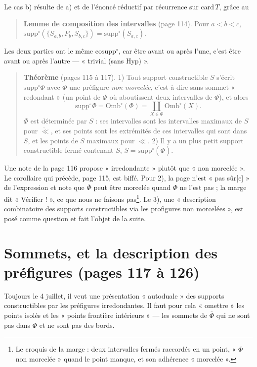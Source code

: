 \documentclass[11pt,a4paper]{article}
\begin{document}
Le cas b) résulte de a) et de l'énoncé réductif par récurrence sur
$\mathrm{card}\, T$, grâce au
\begin{quote}
\textbf{Lemme de composition des intervalles} (page 114). Pour $a < b < c$,
$\mathrm{supp}^{\circ}(\{S_{a,b}, P_{b}, S_{b,c}\}) =
\mathrm{supp}^{\circ}(S_{a,c})$.
\end{quote}
Les deux parties ont le même $\mathrm{cosupp}^{\circ}$, car être avant ou après
l'une, c'est être avant ou après l'autre --- « trivial (sans Hyp) ».

\begin{quote}
\textbf{Théorème} (pages 115 à 117). 1) Tout support constructible $S$ s'écrit
$\mathrm{supp}^{\circ}\Phi$ avec $\Phi$ une préfigure \emph{non morcelée},
c'est-à-dire sans sommet « redondant » (un point de $\Phi$ où aboutissent deux
intervalles de $\Phi$), et alors
\[
\mathrm{supp}^{\circ}\Phi = \mathrm{Omb}^{\circ}(\Phi) = \coprod_{X \in \Phi}
\mathrm{Omb}^{\circ}(X).
\]
$\Phi$ est déterminée par $S$ : ses intervalles sont les intervalles maximaux de
$S$ pour $\mathring{\ll}$, et ses points sont les extrémités de ces intervalles
qui sont dans $S$, et les points de $S$ maximaux pour $\ll$. 2) Il y a un plus
petit support constructible fermé contenant $S$, $\overline{S} =
\mathrm{supp}^{\circ}(\overline{\Phi})$.
\end{quote}

Une note de la page 116 propose « irredondante » plutôt que « non morcelée ».
Le corollaire qui précède, page 115, est biffé. Pour 2), la page n'est « pas
sûr[e] » de l'expression et note que $\overline{\Phi}$ peut être morcelée quand
$\Phi$ ne l'est pas ; la marge dit « Vérifier ! », ce que nous ne faisons
pas\footnote{Le croquis de la marge : deux intervalles fermés raccordés en un
point, « $\Phi$ non morcelée » quand le point manque, et son adhérence
« morcelée ».}. Le 3), une « description combinatoire des supports
constructibles via les profigures non morcelées », est posé comme question et
fait l'objet de la suite.

\section*{Sommets, et la description des préfigures (pages 117 à 126)}

Toujours le 4 juillet, il veut une présentation « autoduale » des supports
constructibles par les préfigures irredondantes. Il faut pour cela « omettre »
les points isolés et les « points frontière intérieurs » --- les sommets de
$\overline{\Phi}$ qui ne sont pas dans $\Phi$ et ne sont pas des bords.
\end{document}
